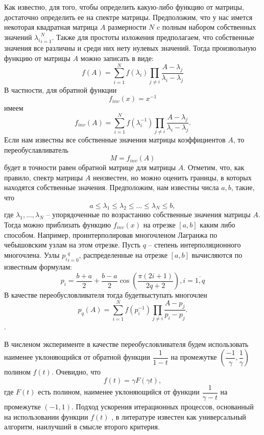 \documentclass[a4paper,14pt]{extreport}
\begin{document}
 Как известно, для того, чтобы определить какую-либо функцию от матрицы, достаточно определить ее на спектре матрицы. Предположим, что у нас имется некоторая квадратная матрица $A$ размерности $N$  c полным набором собственных значений ${\lambda_i}^N_{i=1}$. Также для простоты изложения предполагаем, что собственные значения все различны и среди них нету нулевых значений. Тогда произвольную функцию  от матрицы $A$ можно записать в виде:
	 \begin{equation}
	\label{invf1}
	f(A)=\sum_{i=1}^{N} f(\lambda_i) \prod_{j  \neq i} \dfrac{A - \lambda_j}{\lambda_i - \lambda_j}
	\end{equation}
В частности, для обратной функции
	$$
	f_{inv}(x) = x^{-1} 
	$$
имеем 
	 \begin{equation}
	\label{invf2}
	f_{inv}(A) =\sum_{i=1}^{N} f(\lambda_i^{-1}) \prod_{j  \neq i} \dfrac{A - \lambda_j}{\lambda_i - \lambda_j}.
	\end{equation}
Если нам известны все собственные значения матрицы коэффициентов $A$, то переобуславливатель
	 \begin{equation}
	\label{invf3}
	M =f_{inv}(A)
	\end{equation}
будет в точности равен обратной матрице для матрицы $A$. Отметим, что,  как правило, спектр матрицы $A$ неизвестен, но можно оценить границы, в которых находятся собственные значения. Предположим, нам известны числа $a, b$, такие, что
	$$
	a \leq \lambda_1 \leq \lambda_2 \leq ... \leq \lambda_N \leq b,
	$$
где $\lambda_1, ..., \lambda_N$ -- упорядоченные по возрастанию собственные значения матрицы $A$. Тогда можно приблизать функцию $f_{inv}(x)$ на отрезке $[a, b]$ каким либо способом. Например, проинтерполировав многочленом Лагранжа по чебышовским узлам на этом отрезке.  Пусть $q$ -- степень интерполяционного многочлена. Узлы ${p_i}_{i=0}^q$, распределенные на отрезке $[a, b]$ вычисляются по известным формулам:
 	\begin{equation}
	\label{precondLagr1}
	p_i = \dfrac{b+a}{2} +\dfrac{b-a}{2}\cos(\dfrac{\pi(2i+1)}{2q+2}), i=\overbar{1, q}
	\end{equation}
В качестве переобусловливателя тогда будетвыступать многочлен
	\begin{equation}
	\label{precondLagr2}
	p_q(A) =\sum_{i=1}^{N} f(p_i^{-1}) \prod_{j  \neq i} \dfrac{A - p_j}{p_i - p_j}.
	\end{equation}.

В численом эксперименте в качестве переобусловливателя будем использовать наименее уклоняющийся от обратной функции $\dfrac{1}{1-t}$ на промежутке $(\dfrac{-1}{\gamma}, \dfrac{1}{\gamma})$ полином $f(t)$. Очевидно, что 
$$f(t) = \gamma F(\gamma t),$$
где $F(t)$ есть полином, наименее уклоняющийся от функции $\dfrac{1}{\gamma - t}$ на промежутке $(-1, 1)$. Подход ускорения итерационных процессов, основанный на использовании функции $f(t)$ , в литературе известен как универсальный алгоритм, наилучший в смысле второго критерия\cite{fadeev}.
\end{document}
